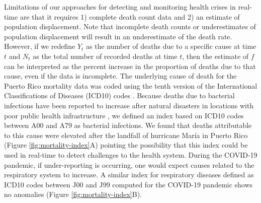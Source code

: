 \documentclass[11pt]{article}
\begin{document}
Limitations of our approaches for detecting and monitoring health crises in real-time are that it requires 1) complete death count data and 2) an estimate of population displacement. Note that incomplete death counts or underestimates of population displacement will result in an underestimate of the death rate. However, if we redefine $Y_t$ as the number of deaths due to a specific cause at time $t$ and $N_t$ as the total number of recorded deaths at time $t$, then the estimate of $f$ can be interpreted as the percent increase in the proportion of deaths due to that cause, even if the data is incomplete. The underlying cause of death for the Puerto Rico mortality data was coded using the tenth version of the International Classifications of Diseases (ICD10) codes \cite{world2004icd}. Because deaths due to bacterial infections have been reported to increase after natural disasters in locations with poor public health infrastructure \cite{ligon2006infectious, cook200810th}, we defined an index based on ICD10 codes between A00 and A79 as bacterial infections. We found that deaths attributable to this cause were elevated after the landfall of hurricane Mar\'ia in Puerto Rico (Figure \ref{fig:mortality-index}A) pointing the possibility that this index could be used in real-time to detect challenges to the health system. During the COVID-19 pandemic, if under-reporting is occurring, one would expect causes related to the respiratory system to increase. A similar index for respiratory diseases defined as ICD10 codes between J00 and J99 computed for the COVID-19 pandemic shows no anomalies  (Figure \ref{fig:mortality-index}B).
\end{document}
